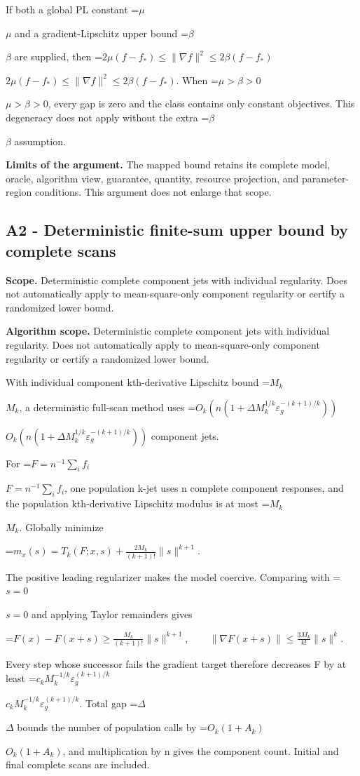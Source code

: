 \documentclass[10pt,a4paper]{article}
\newcommand{\AtlasMath}[1]{\par\begingroup\centering\setbox0=\hbox{$\displaystyle #1$}\ifdim\wd0>1.4\linewidth\typeout{ATLAS WIDE FORMULA: \the\wd0}\fi\ifdim\wd0>\linewidth\resizebox{\linewidth}{!}{\box0}\else\box0\fi\par\endgroup}
\newcommand{\AtlasInlineMath}[1]{\begingroup\setbox0=\hbox{$#1$}\ifdim\wd0>.4\linewidth\endgroup\AtlasMath{#1}\else\endgroup$#1$\fi}
\begin{document}
If both a global PL constant \AtlasInlineMath{\mu} and a gradient-Lipschitz upper bound \AtlasInlineMath{\beta} are supplied, then \AtlasInlineMath{2\mu(f-f_*)\le\|\nabla f\|^2\le2\beta(f-f_*)}. When \AtlasInlineMath{\mu>\beta>0}, every gap is zero and the class contains only constant objectives. This degeneracy does not apply without the extra \AtlasInlineMath{\beta} assumption.

\textbf{Limits of the argument.} The mapped bound retains its complete model, oracle, algorithm view, guarantee, quantity, resource projection, and parameter-region conditions. This argument does not enlarge that scope.

\subsection{A2 - Deterministic finite-sum upper bound by complete scans}
\textbf{Scope.} Deterministic complete component jets with individual regularity. Does not automatically apply to mean-square-only component regularity or certify a randomized lower bound.

\textbf{Algorithm scope.} Deterministic complete component jets with individual regularity. Does not automatically apply to mean-square-only component regularity or certify a randomized lower bound.

With individual component kth-derivative Lipschitz bound \AtlasInlineMath{M_k}, a deterministic full-scan method uses \AtlasInlineMath{O_k(n(1+\Delta M_k^{1/k}\varepsilon_g^{-(k+1)/k}))} component jets.

For \AtlasInlineMath{F=n^{-1}\sum_i f_i}, one population k-jet uses n complete component responses, and the population kth-derivative Lipschitz modulus is at most \AtlasInlineMath{M_k}. Globally minimize

\AtlasMath{m_x(s)=T_k(F;x,s)+\frac{2M_k}{(k+1)!}\|s\|^{k+1}.}

The positive leading regularizer makes the model coercive. Comparing with \AtlasInlineMath{s=0} and applying Taylor remainders gives

\AtlasMath{F(x)-F(x+s)\ge\frac{M_k}{(k+1)!}\|s\|^{k+1},\qquad
\|\nabla F(x+s)\|\le\frac{3M_k}{k!}\|s\|^k.}

Every step whose successor fails the gradient target therefore decreases F by at least \AtlasInlineMath{c_kM_k^{-1/k}\varepsilon_g^{(k+1)/k}}. Total gap \AtlasInlineMath{\Delta} bounds the number of population calls by \AtlasInlineMath{O_k(1+A_k)}, and multiplication by n gives the component count. Initial and final complete scans are included.
\end{document}
